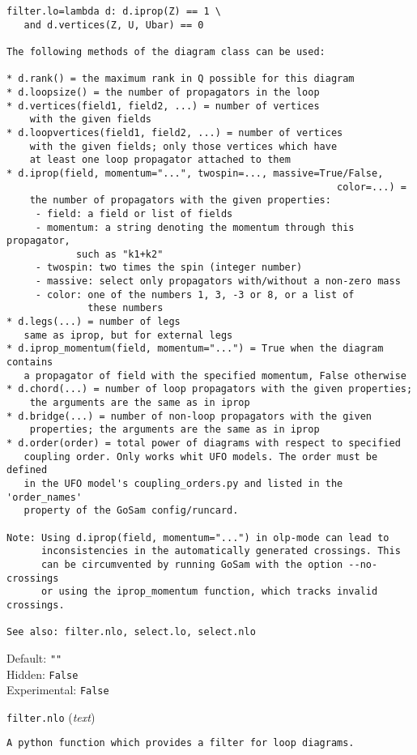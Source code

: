 \begin{basedescript}{\desclabelstyle{\pushlabel}}
\begin{verbatim}
filter.lo=lambda d: d.iprop(Z) == 1 \
   and d.vertices(Z, U, Ubar) == 0

The following methods of the diagram class can be used:

* d.rank() = the maximum rank in Q possible for this diagram
* d.loopsize() = the number of propagators in the loop
* d.vertices(field1, field2, ...) = number of vertices
    with the given fields
* d.loopvertices(field1, field2, ...) = number of vertices
    with the given fields; only those vertices which have
    at least one loop propagator attached to them
* d.iprop(field, momentum="...", twospin=..., massive=True/False,
                                                         color=...) =
    the number of propagators with the given properties:
     - field: a field or list of fields
     - momentum: a string denoting the momentum through this propagator,
            such as "k1+k2"
     - twospin: two times the spin (integer number)
     - massive: select only propagators with/without a non-zero mass
     - color: one of the numbers 1, 3, -3 or 8, or a list of
              these numbers
* d.legs(...) = number of legs
   same as iprop, but for external legs
* d.iprop_momentum(field, momentum="...") = True when the diagram contains
   a propagator of field with the specified momentum, False otherwise
* d.chord(...) = number of loop propagators with the given properties;
    the arguments are the same as in iprop
* d.bridge(...) = number of non-loop propagators with the given
    properties; the arguments are the same as in iprop
* d.order(order) = total power of diagrams with respect to specified
   coupling order. Only works whit UFO models. The order must be defined
   in the UFO model's coupling_orders.py and listed in the 'order_names'
   property of the GoSam config/runcard.

Note: Using d.iprop(field, momentum="...") in olp-mode can lead to
      inconsistencies in the automatically generated crossings. This
      can be circumvented by running GoSam with the option --no-crossings
      or using the iprop_momentum function, which tracks invalid crossings.

See also: filter.nlo, select.lo, select.nlo
\end{verbatim}
Default: \verb|""|
\\Hidden: \verb|False|
\\Experimental: \verb|False|
\\\item[\colorbox{gray!30}{\texttt{filter.nlo}}] (\textit{text})
\begin{verbatim}
A python function which provides a filter for loop diagrams.


\end{verbatim}
\end{basedescript}
